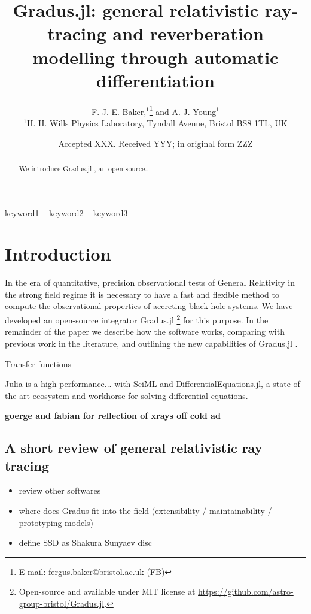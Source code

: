\documentclass[fleqn,usenatbib]{mnras}
\title[Gradus.jl]{Gradus.jl: general relativistic ray-tracing and reverberation modelling through automatic differentiation}
\author[F. J. E. Baker et al.]{
F. J. E. Baker,$^{1}$\thanks{E-mail: fergus.baker@bristol.ac.uk (FB)}
and A. J. Young$^{1}$
\\
$^{1}$H. H. Wills Physics Laboratory, Tyndall Avenue, Bristol BS8 1TL, UK
}
\date{Accepted XXX. Received YYY; in original form ZZZ}
\newcommand{\todo}[1]{{\bf \color{red} #1}}
\newcommand{\notes}[1]{{\color{cyan} #1}}
\newcommand{\Gradus}{Gradus.jl }
\begin{document}
\label{firstpage}
\pagerange{\pageref{firstpage}--\pageref{lastpage}}
\maketitle
\begin{abstract}
	We introduce \Gradus, an open-source...
\end{abstract}

\begin{keywords}
keyword1 -- keyword2 -- keyword3
\end{keywords}



\section{Introduction}

\notes{
In the era of quantitative, precision observational tests of General Relativity in the strong field regime it is necessary to have a fast and flexible method to compute the observational properties of accreting black hole systems. We have developed an open-source integrator 
\Gradus\footnote{Open-source and available under MIT license at \url{https://github.com/astro-group-bristol/Gradus.jl}.} for this purpose. In the remainder of the paper we describe how the software works, comparing with previous work in the literature, and outlining the new capabilities of \Gradus.

Transfer functions \citep{cunningham_effects_1975} %

Julia is a high-performance... with SciML and DifferentialEquations.jl, a state-of-the-art ecosystem and workhorse for solving differential equations. 
}

\todo{goerge and fabian for reflection of xrays off cold ad}

\subsection{A short review of general relativistic ray tracing}

\todo{
\begin{itemize}
    \item review other softwares
    \item where does Gradus fit into the field (extensibility / maintainability / prototyping models)
    \item define SSD as Shakura Sunyaev disc
\end{itemize}
}
\end{document}

